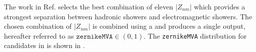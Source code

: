 The work in Ref.\cite{Hershenhorn:2468} selects the best combination of eleven $|Z_{nm}|$ which provides a strongest separation between hadronic showers and electromagnetic showers.
The chosen combination of $|Z_{nm}|$ is combined using a \BDT and produces a single output, hereafter referred to as $\texttt{zernikeMVA}\in(0,1)$.
The \texttt{zernikeMVA} distribution for \BtoXsgamma candidates in  is shown in .
\begin{figure}[htbp!]
    \centering
    \caption{\label{fig:zmva_distribution}}
\end{figure}